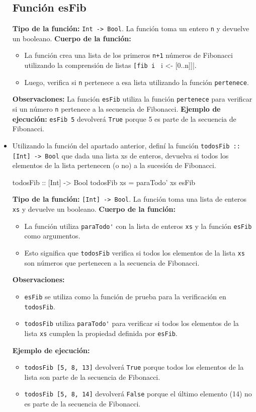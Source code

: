 \documentclass{article}
\begin{document}
\begin{itemize}
\subsection*{Función esFib}
\textbf{Tipo de la función:} \verb|Int -> Bool|. La función toma un entero \verb|n| y devuelve un booleano.
\textbf{Cuerpo de la función:}
\begin{itemize}
\item La función crea una lista de los primeros \verb|n+1| números de Fibonacci utilizando la comprensión de listas \verb|[fib i | i <- [0..n]]|.
\item Luego, verifica si \verb|n| pertenece a esa lista utilizando la función \verb|pertenece|.
\end{itemize}
\textbf{Observaciones:} La función \verb|esFib| utiliza la función \verb|pertenece| para verificar si un número \verb|n| pertenece a la secuencia de Fibonacci.
\textbf{Ejemplo de ejecución:} \verb|esFib 5| devolverá \verb|True| porque 5 es parte de la secuencia de Fibonacci.

    \item 
Utilizando la función del apartado anterior, definí la función \verb|todosFib :: [Int] -> Bool| que dada una lista xs de enteros, devuelva si todos los elementos de la lista pertenecen (o no) a la sucesión de Fibonacci.
\begin{haskell}
todosFib :: [Int] -> Bool
todosFib xs = paraTodo' xs esFib
\end{haskell}
\textbf{Tipo de la función:} \verb|[Int] -> Bool|. La función toma una lista de enteros \verb|xs| y devuelve un booleano.
\newline \textbf{Cuerpo de la función:}
\begin{itemize}
\item La función utiliza \verb|paraTodo'| con la lista de enteros \verb|xs| y la función \verb|esFib| como argumentos.
\item Esto significa que \verb|todosFib| verifica si todos los elementos de la lista \verb|xs| son números que pertenecen a la secuencia de Fibonacci.
\end{itemize}
\textbf{Observaciones:}
\begin{itemize}
\item \verb|esFib| se utiliza como la función de prueba para la verificación en \verb|todosFib|.
\item \verb|todosFib| utiliza \verb|paraTodo'| para verificar si todos los elementos de la lista \verb|xs| cumplen la propiedad definida por \verb|esFib|.
\end{itemize}
\textbf{Ejemplo de ejecución:}
\begin{itemize}
\item \verb|todosFib [5, 8, 13]| devolverá \verb|True| porque todos los elementos de la lista son parte de la secuencia de Fibonacci.
\item \verb|todosFib [5, 8, 14]| devolverá \verb|False| porque el último elemento (14) no es parte de la secuencia de Fibonacci.
\end{itemize}
\end{itemize}
\end{document}

